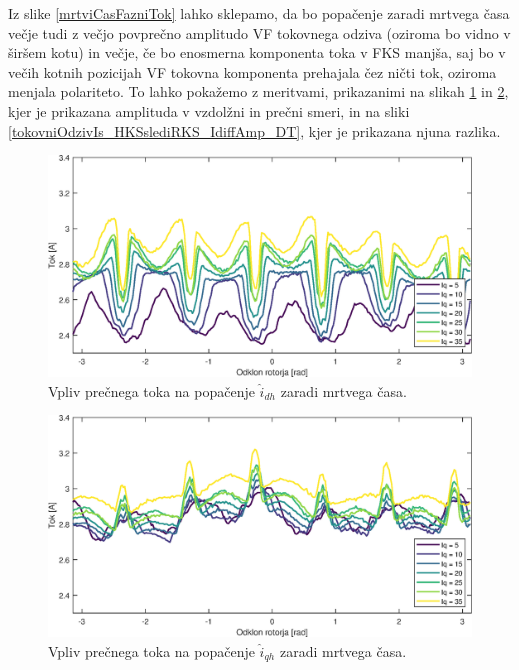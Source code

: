 \documentclass[a4paper,twoside,openright,12pt,slovene]{book}
\begin{document}
Iz slike \ref{mrtviCasFazniTok} lahko sklepamo, da bo popačenje zaradi mrtvega časa večje tudi z večjo povprečno amplitudo VF tokovnega odziva (oziroma bo vidno v širšem kotu) in večje, če bo enosmerna
komponenta toka v FKS manjša, saj bo v večih kotnih pozicijah VF tokovna komponenta prehajala čez ničti tok, oziroma menjala polariteto. To lahko pokažemo z meritvami, prikazanimi na slikah
\ref{tokovniOdzivIs_HKSslediRKS_IdAmp_DT} in \ref{tokovniOdzivIs_HKSslediRKS_IqAmp_DT}, kjer je prikazana amplituda v vzdolžni in prečni smeri, in na sliki
\ref{tokovniOdzivIs_HKSslediRKS_IdiffAmp_DT}, kjer je prikazana njuna razlika.

\begin{figure}[!htbp]
    \centering
    \includegraphics[width=0.75\columnwidth]{Slike/tokovniOdzivIs_HKSslediRKS_IdAmp_DT.eps}
    \caption{\label{tokovniOdzivIs_HKSslediRKS_IdAmp_DT} Vpliv prečnega toka na popačenje $\hat{i}_{dh}$ zaradi mrtvega časa. }
\end{figure}

\begin{figure}[!htbp]
    \centering
    \includegraphics[width=0.75\columnwidth]{Slike/tokovniOdzivIs_HKSslediRKS_IqAmp_DT.eps}
    \caption{\label{tokovniOdzivIs_HKSslediRKS_IqAmp_DT} Vpliv prečnega toka na popačenje $\hat{i}_{qh}$ zaradi mrtvega časa. }
\end{figure}
\end{document}
